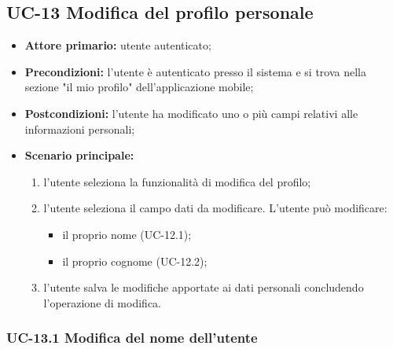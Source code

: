 \subsection{UC-13 Modifica del profilo personale} 
\begin{itemize}

	\item \textbf{Attore primario:} utente autenticato;

	\item \textbf{Precondizioni:} l'utente è autenticato presso il sistema e si trova nella sezione "il mio profilo" dell'applicazione mobile;

	\item \textbf{Postcondizioni:} l'utente ha modificato uno o più campi relativi alle informazioni personali;

	\item \textbf{Scenario principale:} 
	
		\begin{enumerate}
    		\item  l'utente seleziona la funzionalità di modifica del profilo;
    		\item  l'utente seleziona il campo dati da modificare. L'utente può modificare:
    		
    			\begin{itemize}
        			\item il proprio nome (UC-12.1); 
        			\item il proprio cognome (UC-12.2); 
    			\end{itemize} 
    			
    		\item l'utente salva le modifiche apportate ai dati personali concludendo l'operazione di modifica.
    		
		\end{enumerate}
		
\end{itemize}


\subsubsection{UC-13.1 Modifica del nome dell'utente}

